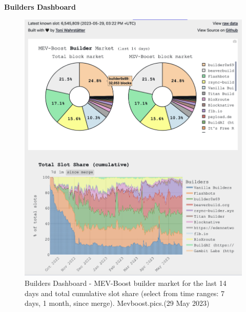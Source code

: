 \documentclass[UTF8]{article}
\begin{document}
\clearpage
\textbf{Builders Dashboard} 
\begin{figure}[htbp]
\begin{center}
\includegraphics[width=0.85\linewidth]{images/mevbuilder1}
\caption{Builders Dashboard - MEV-Boost builder market for the last 14 days  and total cumulative slot share (select from time ranges: 7 days, 1 month, since merge). Mevboost.pics.(29 May 2023)}
\label{fig:mevbuilder1}
\end{center}
\end{figure}
\end{document}
